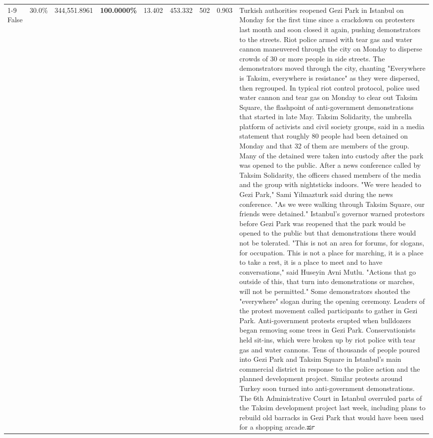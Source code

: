 \begin{table}[H]
\begin{tabular}{lllrlllll}
\cline{1-9}
False & 30.0\% & 344,551.8961 & \bfseries \color{red} 100.0000\% & 13.402 & 453.332 & 502 & 0.903 & Turkish authorities reopened Gezi Park in Istanbul on Monday for the first time since a crackdown on protesters last month and soon closed it again, pushing demonstrators to the streets. Riot police armed with tear gas and water cannon maneuvered through the city on Monday to disperse crowds of 30 or more people in side streets. The demonstrators moved through the city, chanting "Everywhere is Taksim, everywhere is resistance" as they were dispersed, then regrouped. In typical riot control protocol, police used water cannon and tear gas on Monday to clear out Taksim Square, the flashpoint of anti-government demonstrations that started in late May. Taksim Solidarity, the umbrella platform of activists and civil society groups, said in a media statement that roughly 80 people had been detained on Monday and that 32 of them are members of the group. Many of the detained were taken into custody after the park was opened to the public. After a news conference called by Taksim Solidarity, the officers chased members of the media and the group with nightsticks indoors. "We were headed to Gezi Park," Sami Yilmazturk said during the news conference. "As we were walking through Taksim Square, our friends were detained." Istanbul's governor warned protestors before Gezi Park was reopened that the park would be opened to the public but that demonstrations there would not be tolerated. "This is not an area for forums, for slogans, for occupation. This is not a place for marching, it is a place to take a rest, it is a place to meet and to have conversations," said Huseyin Avni Mutlu. "Actions that go outside of this, that turn into demonstrations or marches, will not be permitted." Some demonstrators shouted the "everywhere" slogan during the opening ceremony. Leaders of the protest movement called participants to gather in Gezi Park. Anti-government protests erupted when bulldozers began removing some trees in Gezi Park. Conservationists held sit-ins, which were broken up by riot police with tear gas and water cannons. Tens of thousands of people poured into Gezi Park and Taksim Square in Istanbul's main commercial district in response to the police action and the planned development project. Similar protests around Turkey soon turned into anti-government demonstrations. The 6th Administrative Court in Istanbul overruled parts of the Taksim development project last week, including plans to rebuild old barracks in Gezi Park that would have been used for a shopping arcade.ರ್ಷ \\

\end{tabular}
\end{table}
